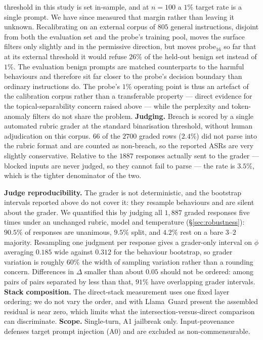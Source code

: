 threshold in this study is set in-sample, and at $n=100$ a $1\%$ target rate is a single
prompt. We have since measured that margin rather than leaving it unknown. Recalibrating on an
external corpus of $805$ general instructions, disjoint from both the evaluation set and the
probe's training pool, moves the surface filters only slightly and in the permissive
direction, but moves probe$_{16}$ so far that at its external threshold it would refuse $26\%$
of the held-out benign set instead of $1\%$. The evaluation benign prompts are matched
counterparts to the harmful behaviours and therefore sit far closer to the probe's decision
boundary than ordinary instructions do. The probe's $1\%$ operating point is thus an artefact
of the calibration corpus rather than a transferable property --- direct evidence for the
topical-separability concern raised above --- while the perplexity and token-anomaly filters
do not share the problem.
\textbf{Judging.} Breach is scored by a single automated rubric grader at the standard
binarisation threshold, without human adjudication on this corpus. $66$ of the $2700$ graded
rows ($2.4\%$) did not parse into the rubric format and are counted as non-breach, so the
reported ASRs are very slightly conservative. Relative to the $1887$ responses actually sent
to the grader --- blocked inputs are never judged, so they cannot fail to parse --- the rate
is $3.5\%$, which is the tighter denominator of the two.

\textbf{Judge reproducibility.} The grader is not deterministic, and the bootstrap intervals
reported above do not cover it: they resample behaviours and are silent about the grader. We
quantified this by judging all $1{,}887$ graded responses five times under an unchanged rubric,
model and temperature (\S\ref{sec:robustness}): $90.5\%$ of responses are unanimous, $9.5\%$
split, and $4.2\%$ rest on a bare $3$--$2$ majority. Resampling one judgment per response gives
a grader-only interval on $\phi$ averaging $0.185$ wide against $0.312$ for the behaviour
bootstrap, so grader variation is roughly $60\%$ the width of sampling variation rather than a
rounding concern. Differences in $\Delta$ smaller than about $0.05$ should not be ordered:
among pairs of pairs separated by less than that, $91\%$ have overlapping grader intervals.
\textbf{Stack composition.} The direct-stack measurement uses one fixed layer ordering; we
do not vary the order, and with Llama~Guard present the assembled residual is near zero,
which limits what the intersection-versus-direct comparison can discriminate.
\textbf{Scope.} Single-turn, A1 jailbreak only. Input-provenance defenses target prompt
injection (A0) and are excluded as non-commensurable.
